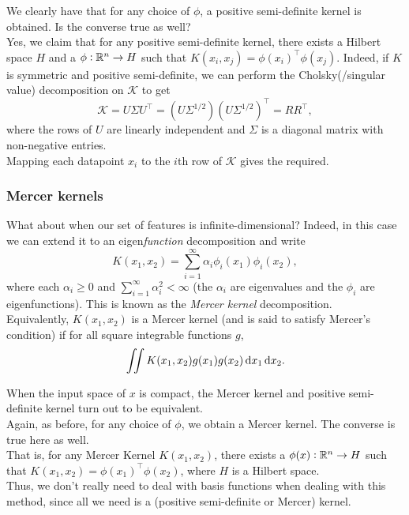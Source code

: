 \documentclass{article}
\begin{document}
			We clearly have that for any choice of $\phi$, a positive semi-definite kernel is obtained. Is the converse true as well?\\
			Yes, we claim that for any positive semi-definite kernel, there exists a Hilbert space $H$ and a $\phi:\mathbb{R}^n \to H$ such that $K(x_i,x_j) = \phi(x_i)^\top \phi(x_j)$. Indeed, if $K$ is symmetric and positive semi-definite, we can perform the Cholsky(/singular value) decomposition on $\mathcal{K}$ to get
			\[ \mathcal{K} = U\Sigma U^\top = (U\Sigma^{1/2})(U\Sigma^{1/2})^\top = RR^\top, \]
			where the rows of $U$ are linearly independent and $\Sigma$ is a diagonal matrix with non-negative entries.\\
			Mapping each datapoint $x_i$ to the $i$th row of $\mathcal{K}$ gives the required.\\

		\subsubsection{Mercer kernels}

			What about when our set of features is infinite-dimensional? Indeed, in this case we can extend it to an eigen\emph{function} decomposition and write
			\[ K(x_1,x_2) = \sum_{i=1}^\infty \alpha_i \phi_i(x_1) \phi_i(x_2), \]
			where each $\alpha_i \ge 0$ and $\sum_{i=1}^\infty \alpha_i^2 < \infty$ (the $\alpha_i$ are eigenvalues and the $\phi_i$ are eigenfunctions). This is known as the \emph{Mercer kernel} decomposition.\\

			Equivalently, $K(x_1,x_2)$ is a Mercer kernel (and is said to satisfy Mercer's condition) if for all square integrable functions $g$,
			\[ \iint K(x_1,x_2) g(x_1) g(x_2) \dif x_1 \dif x_2. \]

			When the input space of $x$ is compact, the Mercer kernel and positive semi-definite kernel turn out to be equivalent.\\
			
			Again, as before, for any choice of $\phi$, we obtain a Mercer kernel. The converse is true here as well.\\
			That is, for any Mercer Kernel $K(x_1,x_2)$, there exists a $\phi(x) : \mathbb{R}^n \to H$ such that $K(x_1,x_2) = \phi(x_1)^\top \phi(x_2)$, where $H$ is a Hilbert space.\\

			Thus, we don't really need to deal with basis functions when dealing with this method, since all we need is a (positive semi-definite or Mercer) kernel.
\end{document}
